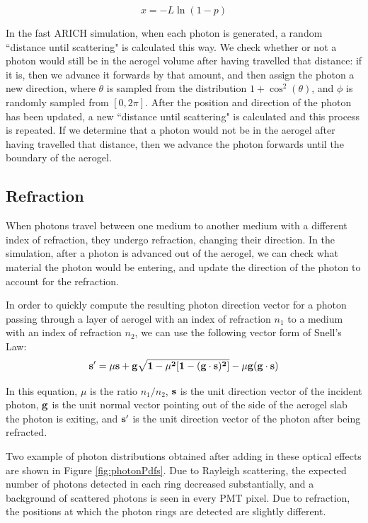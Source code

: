 \begin{equation}
x =   -L\ln(1-p)
  \label{eq:randomScat}
\end{equation}

In the fast ARICH simulation, when each photon is generated, a random ``distance until scattering" is calculated this way. 
We check whether or not a photon would still be in the aerogel volume after having travelled that distance: if it is, then we advance it forwards by that amount, and then assign the photon a new direction, where $\theta$ is sampled from the distribution $1 + \cos^2(\theta)$, and $\phi$ is randomly sampled from $[0, 2\pi]$.
After the position and direction of the photon has been updated, a new ``distance until scattering" is calculated and this process is repeated. 
If we determine that a photon would not be in the aerogel after having travelled that distance, then we advance the photon forwards until the boundary of the aerogel.

\subsection{Refraction}
When photons travel between one medium to another medium with a different index of refraction, they undergo refraction, changing their direction.
In the simulation, after a photon is advanced out of the aerogel, we can check what material the photon would be entering, and update the direction of the photon to account for the refraction.

In order to quickly compute the resulting photon direction vector for a photon passing through a layer of aerogel with an index of refraction $n_1$ to a medium with an index of refraction $n_2$, we can use the following vector form of Snell's Law: \cite{snell}
\begin{equation}
\bf{s'} = \mu\bf{s} + \bf{g}\sqrt{1 - \mu^2[1-(\bf{g \cdot s})^2]} - \mu \bf{g}(\bf{g \cdot s})
\label{eq:refract}
\end{equation}

In this equation, $\mu$ is the ratio $n_1/n_2$,  $\bf{s}$ is the unit direction vector of the incident photon, $\bf{g}$ is the unit normal vector pointing out of the side of the aerogel slab the photon is exiting, and $\bf{s'}$ is the unit direction vector of the photon after being refracted.

Two example of photon distributions obtained after adding in these optical effects are shown in Figure \ref{fig:photonPdfs}.
Due to Rayleigh scattering, the expected number of photons detected in each ring decreased substantially, and a background of scattered photons is seen in every PMT pixel.
Due to refraction, the positions at which the photon rings are detected are slightly different.

